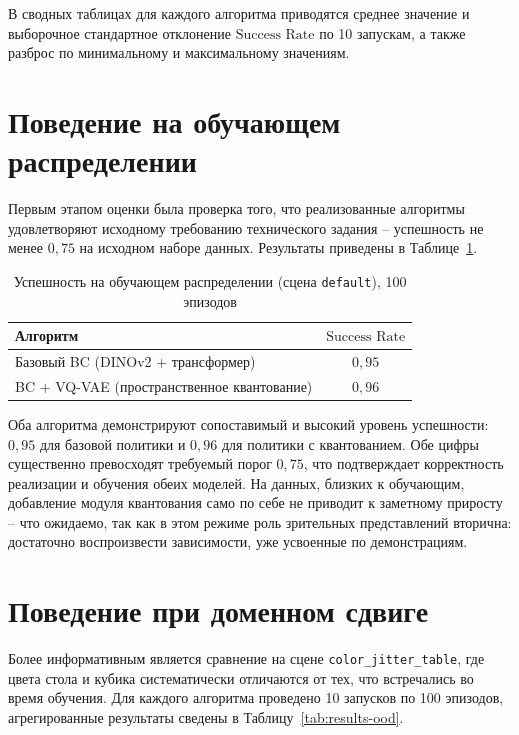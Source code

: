 В сводных таблицах для каждого алгоритма приводятся среднее значение и выборочное стандартное отклонение $\text{Success Rate}$ по 10 запускам, а также разброс по минимальному и максимальному значениям.

\section{Поведение на обучающем распределении}
\label{sec:results-indist}

Первым этапом оценки была проверка того, что реализованные алгоритмы удовлетворяют исходному требованию технического задания -- успешность не менее $0{,}75$ на исходном наборе данных. Результаты приведены в Таблице~\ref{tab:results-default}.

\begin{table}[h]
\centering
\caption{Успешность на обучающем распределении (сцена \texttt{default}), 100 эпизодов}
\label{tab:results-default}
\begin{tabular}{lc}
\toprule
Алгоритм & $\text{Success Rate}$ \\
\midrule
Базовый BC (DINOv2 + трансформер)          & $0{,}95$ \\
BC + VQ-VAE (пространственное квантование) & $0{,}96$ \\
\bottomrule
\end{tabular}
\end{table}

Оба алгоритма демонстрируют сопоставимый и высокий уровень успешности: $0{,}95$ для базовой политики и $0{,}96$ для политики с квантованием. Обе цифры существенно превосходят требуемый порог $0{,}75$, что подтверждает корректность реализации и обучения обеих моделей. На данных, близких к обучающим, добавление модуля квантования само по себе не приводит к заметному приросту -- что ожидаемо, так как в этом режиме роль зрительных представлений вторична: достаточно воспроизвести зависимости, уже усвоенные по демонстрациям.

\section{Поведение при доменном сдвиге}
\label{sec:results-ood}

Более информативным является сравнение на сцене \texttt{color\_jitter\_table}, где цвета стола и кубика систематически отличаются от тех, что встречались во время обучения. Для каждого алгоритма проведено 10 запусков по 100 эпизодов, агрегированные результаты сведены в Таблицу~\ref{tab:results-ood}.

